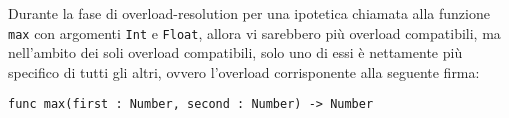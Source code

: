 Durante la fase di overload-resolution per una ipotetica chiamata alla funzione \texttt{max}
con argomenti \texttt{Int} e \texttt{Float}, allora vi sarebbero più overload compatibili, 
ma nell’ambito dei soli overload compatibili, solo uno di essi è nettamente più specifico 
di tutti gli altri, ovvero l'overload corrisponente alla seguente firma:

\vspace{0.5cm}
\begin{lstlisting}[frame=single]
func max(first : Number, second : Number) -> Number
\end{lstlisting}
\vspace{0.5cm}

\newpage